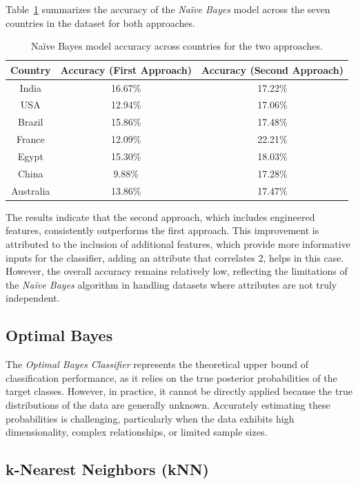 \documentclass{article}
\begin{document}
Table~\ref{tab:naive_bayes_results} summarizes the accuracy of the \textit{Na\"{i}ve Bayes} model across the seven countries in the dataset for both approaches.

\begin{table}[h!]
    \centering
    \begin{tabular}{|c|c|c|}
        \hline
        \textbf{Country} & \textbf{Accuracy (First Approach)} & \textbf{Accuracy (Second Approach)} \\ \hline
        India & 16.67\% & 17.22\% \\
        USA & 12.94\% & 17.06\% \\
        Brazil & 15.86\% & 17.48\% \\
        France & 12.09\% & 22.21\% \\
        Egypt & 15.30\% & 18.03\% \\
        China & 9.88\% & 17.28\% \\
        Australia & 13.86\% & 17.47\% \\ \hline
    \end{tabular}
    \caption{Na\"{i}ve Bayes model accuracy across countries for the two approaches.}
    \label{tab:naive_bayes_results}
\end{table}

The results indicate that the second approach, which includes engineered features, consistently outperforms the first approach. This improvement is attributed to the inclusion of additional features, which provide more informative inputs for the classifier, adding an attribute that correlates 2, helps in this case. However, the overall accuracy remains relatively low, reflecting the limitations of the \textit{Na\"{i}ve Bayes} algorithm in handling datasets where attributes are not truly independent.

\subsection{Optimal Bayes}
The \textit{Optimal Bayes Classifier} represents the theoretical upper bound of classification performance, as it relies on the true posterior probabilities of the target classes. However, in practice, it cannot be directly applied because the true distributions of the data are generally unknown. Accurately estimating these probabilities is challenging, particularly when the data exhibits high dimensionality, complex relationships, or limited sample sizes.

\subsection{k-Nearest Neighbors (kNN)}
\end{document}
